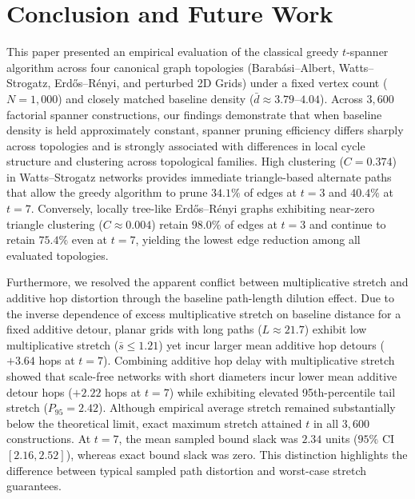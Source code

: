 \documentclass[conference]{IEEEtran}
\begin{document}
\section{Conclusion and Future Work}

This paper presented an empirical evaluation of the classical greedy $t$-spanner algorithm across four canonical graph topologies (Barab\'{a}si--Albert, Watts--Strogatz, Erd\H{o}s--R\'{e}nyi, and perturbed 2D Grids) under a fixed vertex count ($N = 1,000$) and closely matched baseline density ($\bar{d} \approx 3.79\text{--}4.04$). Across $3,600$ factorial spanner constructions, our findings demonstrate that when baseline density is held approximately constant, spanner pruning efficiency differs sharply across topologies and is strongly associated with differences in local cycle structure and clustering across topological families. High clustering ($C = 0.374$) in Watts--Strogatz networks provides immediate triangle-based alternate paths that allow the greedy algorithm to prune $34.1\%$ of edges at $t = 3$ and $40.4\%$ at $t = 7$. Conversely, locally tree-like Erd\H{o}s--R\'{e}nyi graphs exhibiting near-zero triangle clustering ($C \approx 0.004$) retain $98.0\%$ of edges at $t = 3$ and continue to retain $75.4\%$ even at $t = 7$, yielding the lowest edge reduction among all evaluated topologies.

Furthermore, we resolved the apparent conflict between multiplicative stretch and additive hop distortion through the baseline path-length dilution effect. Due to the inverse dependence of excess multiplicative stretch on baseline distance for a fixed additive detour, planar grids with long paths ($L \approx 21.7$) exhibit low multiplicative stretch ($\bar{s} \le 1.21$) yet incur larger mean additive hop detours ($+3.64$ hops at $t = 7$). Combining additive hop delay with multiplicative stretch showed that scale-free networks with short diameters incur lower mean additive detour hops ($+2.22$ hops at $t = 7$) while exhibiting elevated 95th-percentile tail stretch ($P_{95} = 2.42$). Although empirical average stretch remained substantially below the theoretical limit, exact maximum stretch attained $t$ in all $3,600$ constructions. At $t=7$, the mean sampled bound slack was $2.34$ units ($95\%$ CI $[2.16, 2.52]$), whereas exact bound slack was zero. This distinction highlights the difference between typical sampled path distortion and worst-case stretch guarantees.
\end{document}
